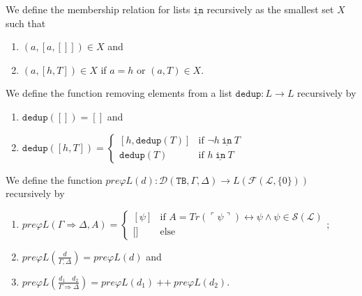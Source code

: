 \begin{definition}\label{def:List-Mem}
    \leanok
    We define the membership relation for lists $\underline{\texttt{in}}$ recursively as the smallest set $X$ such that
    \begin{enumerate}
    \item $(a,[a,[]]) \in X$ and
    \item $(a,[h,T]) \in X$ if $a = h$ or $(a,T) \in X$.
    \end{enumerate}
\end{definition}

\begin{definition}\label{def:dedup}
    \leanok
    We define the function removing elements from a list $\texttt{dedup} : L \to L$ recursively by
    \begin{enumerate}
    \item $\texttt{dedup}([]) = []$ and
    \item $\texttt{dedup}([h,T]) = \begin{cases}
    [h,\texttt{dedup}(T)] & \text{if } \neg h ~\underline{\texttt{in}}~ T \\
    \texttt{dedup}(T) & \text{if } h ~\underline{\texttt{in}}~ T
    \end{cases}$
    \end{enumerate}
\end{definition}

\begin{definition}\label{def:Pre-Rel-Phis}
    \leanok
    We define the function $pre\varphi L(d) : \mathcal{D}(\texttt{TB},\Gamma,\Delta) \to L(\mathcal{F}(\mathcal{L},\{0\}))$ recursively by
    \begin{enumerate}
    \item $pre\varphi L(\Gamma \Rightarrow \Delta, A) = \begin{cases}
        [\psi] & \text{if } A = Tr(\ulcorner \psi \urcorner) \leftrightarrow \psi \wedge \psi \in \mathcal{S}(\mathcal{L}) \\
        \text{[]} & \text{else}
    \end{cases}$;
    \item $pre\varphi L(\frac{d}{\Gamma, \Delta}) = pre\varphi L(d)$ and
    \item $pre\varphi L(\frac{d_1 \quad d_2}{\Gamma \Rightarrow \Delta}) = pre\varphi L(d_1) ~\texttt{++}~ pre\varphi L(d_2)
$.
    \end{enumerate}
\end{definition} 

